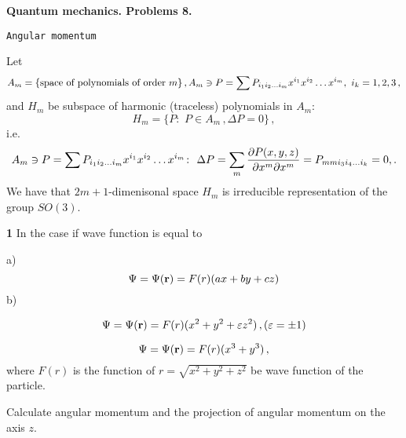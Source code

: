 \baselineskip=14pt
\def\vare {\varepsilon}
\def\A {{\bf A}}
\def\t {\tilde}
\def\a {\alpha}
\def\K {{\bf K}}
\def\N {{\bf N}}
\def\V {{\cal V}}
\def\s {{\sigma}}
\def\S {{\Sigma}}
\def\s {{\sigma}}
\def\p{\partial}
\def\vare{{\varepsilon}}
\def\Q {{\bf Q}}
\def\D {{\cal D}}
\def\G {{\Gamma}}
\def\C {{\bf C}}
\def\M {{\cal M}}
\def\Z {{\bf Z}}
\def\U  {{\cal U}}
\def\H {{\cal H}}
\def\R  {{\bf R}}
\def\S  {{\bf S}}
\def\E  {{\bf E}}
\def\l {\lambda}
\def\ll {{\bf l}}
\def\degree {{\bf {\rm degree}\,\,}}
\def \finish {${\,\,\vrule height1mm depth2mm width 8pt}$}
\def \m {\medskip}
\def\p {\partial}
\def\r {{\bf r}}
\def\pt {{\bf p}}
\def\v {{\bf v}}
\def\n {{\bf n}}
\def\t {{\bf t}}
\def\b {{\bf b}}
\def\c {{\bf c }}
\def\e{{\bf e}}
\def\ac {{\bf a}}
\def \X   {{\bf X}}
\def \Y   {{\bf Y}}
\def \x   {{\bf x}}
\def \y   {{\bf y}}
\def \z   {{\bf z}}
\def \G{{\cal G}}
\def\w {{\omega}}
\def \Tr  {{\rm Tr\,}}
\def\V {{\cal V}}
\def\H {{\cal H}}


\centerline {\bf Quantum mechanics. Problems 8.}

\centerline {\tt Angular momentum}


 Let
            $$
 A_m=\{\hbox{space of polynomials of order $m$}\}\,,
 A_m\ni P=\sum P_{i_1i_2\dots i_m}x^{i_1}x^{i_2}\dots x^{i_m},\,\,
     i_k=1,2,3\,,
             $$
and
         $H_m$ be subspace of harmonic (traceless) polynomials in $A_m$:
                   $$
H_m=\{P\colon \,\, P\in A_m\,, \Delta P=0\}\,,
                   $$
i.e.
             $$
A_m\ni P=\sum P_{i_1i_2\dots i_m}x^{i_1}x^{i_2}\dots x^{i_m}\colon\,\,
      \Delta P=\sum_m{\p P(x,y,z)\over \p x^m \p x^m}=
P_{mmi_3i_4\dots i_k}=0,.
             $$
We have that 
$2m+1$-dimenisonal space $H_m$ is irreducible representation of the group
  $SO(3)$. 


      \bigskip

     {\bf 1}  In the case if wave function is equal to

a) 
                    $$
\Psi=\Psi(\r)=F(r)(ax+by+cz)
                    $$ 
b)

                    $$
\Psi=\Psi(\r)=F(r)(x^2+y^2+\vare z^2)\,, (\vare=\pm 1)
                    $$ 

                    $$
\Psi=\Psi(\r)=F(r)(x^3+y^3)\,,
                    $$ 
where $F(r)$ is the function of $r=\sqrt {x^2+y^2+z^2}$
be wave function of the particle.

Calculate angular momentum and the projection of angular momentum
on the axis $z$.

